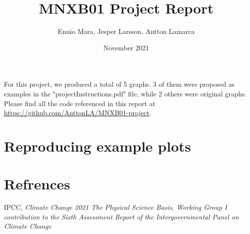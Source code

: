 \documentclass{article}
\title{MNXB01 Project Report}
\author{Ennio Mara, Jesper Larsson, Antton Lamarca }
\date{November 2021}
\begin{document}
\maketitle

For this project, we produced a total of 5 graphs. 3 of them were proposed as examples in the "projectInstructions.pdf" file, while 2 others were original graphs. Please find all the code referenced in this report at \url{https://github.com/AnttonLA/MNXB01-project}.

\section{Reproducing example plots}











\section{Refrences}
\begin{thebibliography}{}

 IPCC, \textit{Climate Change 2021 The Physical Science Basis, Working Group I contribution to the Sixth Assessment Report of the Intergovernmental Panel on Climate Change}

\end{thebibliography}
\end{document}
